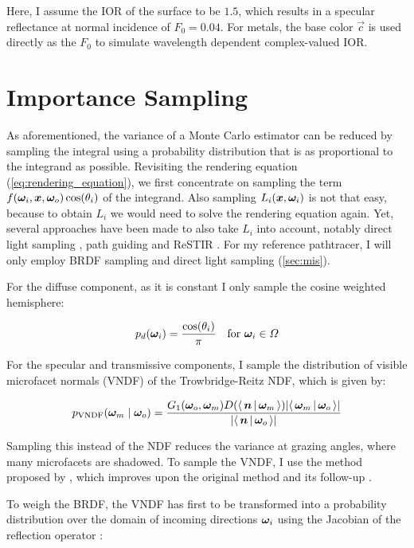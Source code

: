 Here, I assume the IOR of the surface to be $1.5$, which results in a specular reflectance at normal incidence of $F_0 = 0.04$.
For metals, the base color $\vec{c}$ is used directly as the $F_0$ to simulate wavelength dependent complex-valued IOR.

\section{Importance Sampling}

As aforementioned, the variance of a Monte Carlo estimator can be reduced by sampling the integral using a probability distribution that is as proportional to the integrand as possible.
Revisiting the rendering equation (\ref{eq:rendering_equation}), we first concentrate on sampling the term $f(\bm{\omega}_i, \bm{x}, \bm{\omega}_o) \cos(\theta_i)$ of the integrand.
Also sampling $L_i(\bm{x}, \bm{\omega}_i)$ is not that easy, because to obtain $L_i$ we would need to solve the rendering equation again.
Yet, several approaches have been made to also take $L_i$ into account, notably direct light sampling , path guiding  and ReSTIR .
For my reference pathtracer, I will only employ BRDF sampling and direct light sampling (\ref{sec:mis}).

For the diffuse component, as it is constant I only sample the cosine weighted hemisphere:

\begin{equation}
    p_d(\bm{\omega}_i) = \frac{\cos(\theta_i)}{\pi} \quad \text{for } \bm{\omega}_i \in \Omega
\end{equation}

For the specular and transmissive components, I sample the distribution of visible microfacet normals (VNDF)  of the Trowbridge-Reitz NDF, which is given by:

\begin{equation}
    p_\mathrm{VNDF}(\wm \mid \wo) = \frac{G_1(\wo, \wm) D(\NdotH) |\VdotH|}{|\NdotV|}
\end{equation}

Sampling this instead of the NDF reduces the variance at grazing angles, where many microfacets are shadowed.
To sample the VNDF, I use the method proposed by \textcite{benyoub2024}, which improves upon the original method  and its follow-up .

To weigh the BRDF, the VNDF has first to be transformed into a probability distribution over the domain of incoming directions $\bm{\omega}_i$ using the Jacobian of the reflection operator :

